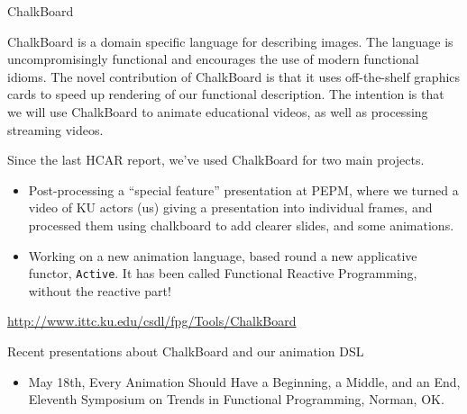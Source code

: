 \documentclass{scrreprt}
\begin{document}
\begin{hcarentry}{ChalkBoard}
\makeheader

ChalkBoard is a domain specific language for describing images. 
The language is uncompromisingly functional
and encourages the use of modern functional idioms.
The novel contribution of ChalkBoard is that it uses off-the-shelf
graphics cards to speed up rendering of our functional description.
The intention is that we will use ChalkBoard to animate educational
videos, as well as processing streaming videos.

Since the last HCAR report, we've used ChalkBoard for two main projects.
\begin{itemize}
\item Post-processing a ``special feature'' presentation at PEPM, where we turned
a video of KU actors (us) giving a presentation into individual frames,
and processed them using chalkboard to add clearer slides, and some animations.
\item Working on a new animation language, based round a new applicative
functor, \verb|Active|. It has been called Functional Reactive Programming,
without the reactive part!
\end{itemize}

\FurtherReading
  \url{http://www.ittc.ku.edu/csdl/fpg/Tools/ChalkBoard}

Recent presentations about ChalkBoard and our animation DSL
\begin{itemize}
\item May 18th, Every Animation Should Have a Beginning, a Middle, and an End, Eleventh Symposium on Trends in Functional Programming, Norman, OK.
\end{itemize}

\end{hcarentry}
\end{document}
